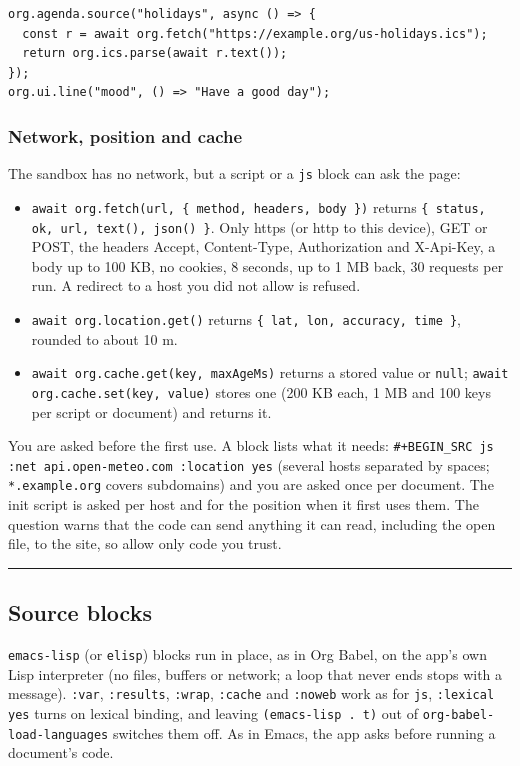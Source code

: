 \documentclass[11pt]{article}
\begin{document}
\begin{verbatim}
org.agenda.source("holidays", async () => {
  const r = await org.fetch("https://example.org/us-holidays.ics");
  return org.ics.parse(await r.text());
});
org.ui.line("mood", () => "Have a good day");
\end{verbatim}

\subsubsection{Network, position and cache}
\label{sec:org41249f6}
The sandbox has no network, but a script or a \texttt{js} block can ask the page:
\begin{itemize}
\item \texttt{await org.fetch(url, \{ method, headers, body \})} returns \texttt{\{ status, ok, url, text(), json() \}}. Only https (or http to this device), GET or POST, the headers Accept, Content-Type, Authorization and X-Api-Key, a body up to 100 KB, no cookies, 8 seconds, up to 1 MB back, 30 requests per run. A redirect to a host you did not allow is refused.
\item \texttt{await org.location.get()} returns \texttt{\{ lat, lon, accuracy, time \}}, rounded to about 10 m.
\item \texttt{await org.cache.get(key, maxAgeMs)} returns a stored value or \texttt{null}; \texttt{await org.cache.set(key, value)} stores one (200 KB each, 1 MB and 100 keys per script or document) and returns it.
\end{itemize}
You are asked before the first use. A block lists what it needs: \texttt{\#+BEGIN\_SRC js :net api.open-meteo.com :location yes} (several hosts separated by spaces; \texttt{*.example.org} covers subdomains) and you are asked once per document. The init script is asked per host and for the position when it first uses them. The question warns that the code can send anything it can read, including the open file, to the site, so allow only code you trust.

\noindent\rule{\textwidth}{0.5pt}

\subsection{Source blocks}
\label{sec:org2fd54e4}
\texttt{emacs-lisp} (or \texttt{elisp}) blocks run in place, as in Org Babel, on the app's own Lisp interpreter (no files, buffers or network; a loop that never ends stops with a message). \texttt{:var}, \texttt{:results}, \texttt{:wrap}, \texttt{:cache} and \texttt{:noweb} work as for \texttt{js}, \texttt{:lexical yes} turns on lexical binding, and leaving \texttt{(emacs-lisp . t)} out of \texttt{org-babel-load-languages} switches them off. As in Emacs, the app asks before running a document's code.
\end{document}
